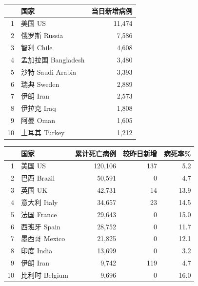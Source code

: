 \documentclass[]{article}
\begin{document}
\begin{table}[H]
    \begin{minipage}{.4\linewidth}
    \centering
    \captionsetup{justification=centering}
    \caption{日新增病例前十位国家}
    \vspace{-0.5\baselineskip}
      \centering
    \captionsetup{justification=centering} \begin{table}[H]
\centering
\begin{tabular}{rlr}
\toprule
  & 国家 & 当日新增病例\\
\midrule
\rowcolor{gray!6}  1 & 美国 US & 11,474\\
2 & 俄罗斯 Russia & 7,586\\
\rowcolor{gray!6}  3 & 智利 Chile & 4,608\\
4 & 孟加拉国 Bangladesh & 3,480\\
\rowcolor{gray!6}  5 & 沙特 Saudi Arabia & 3,393\\
6 & 瑞典 Sweden & 2,889\\
\rowcolor{gray!6}  7 & 伊朗 Iran & 2,573\\
8 & 伊拉克 Iraq & 1,808\\
\rowcolor{gray!6}  9 & 阿曼 Oman & 1,605\\
10 & 土耳其 Turkey & 1,212\\
\bottomrule
\end{tabular}
\end{table} \end{minipage}
    \begin{minipage}{.6\linewidth}
    \centering
    \captionsetup{justification=centering}
     \caption{累计死亡病例前十位国家}
     \vspace{-0.5\baselineskip}
      \centering
    \captionsetup{justification=centering} \begin{table}[H]
\centering
\begin{tabular}{rlrrr}
\toprule
  & 国家 & 累计死亡病例 & 较昨日新增 & 病死率\%\\
\midrule
\rowcolor{gray!6}  1 & 美国 US & 120,106 & 137 & 5.2\\
2 & 巴西 Brazil & 50,591 & 0 & 4.7\\
\rowcolor{gray!6}  3 & 英国 UK & 42,731 & 14 & 13.9\\
4 & 意大利 Italy & 34,657 & 23 & 14.5\\
\rowcolor{gray!6}  5 & 法国 France & 29,643 & 0 & 15.0\\
6 & 西班牙 Spain & 28,752 & 0 & 11.7\\
\rowcolor{gray!6}  7 & 墨西哥 Mexico & 21,825 & 0 & 12.1\\
8 & 印度 India & 13,699 & 0 & 3.2\\
\rowcolor{gray!6}  9 & 伊朗 Iran & 9,742 & 119 & 4.7\\
10 & 比利时 Belgium & 9,696 & 0 & 16.0\\
\bottomrule
\end{tabular}
\end{table} \end{minipage} 
\end{table}
\end{document}
